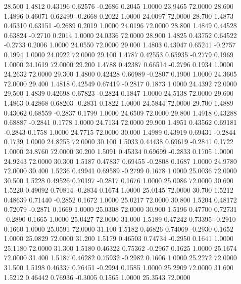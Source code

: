   28.500   1.4812   0.43196   0.62576  -0.2686   0.2045   1.0000  23.9465  72.0000
  28.600   1.4896   0.46071   0.62499  -0.2668   0.2022   1.0000  24.0097  72.0000
  28.700   1.4873   0.45310   0.63151  -0.2689   0.2019   1.0000  24.0196  72.0000
  28.800   1.4849   0.44528   0.63824  -0.2710   0.2014   1.0000  24.0336  72.0000
  28.900   1.4825   0.43752   0.64522  -0.2733   0.2006   1.0000  24.0550  72.0000
  29.000   1.4803   0.43047   0.65241  -0.2757   0.1994   1.0000  24.0922  72.0000
  29.100   1.4787   0.42553   0.65935  -0.2779   0.1969   1.0000  24.1619  72.0000
  29.200   1.4788   0.42387   0.66514  -0.2796   0.1934   1.0000  24.2632  72.0000
  29.300   1.4800   0.42428   0.66989  -0.2807   0.1900   1.0000  24.3605  72.0000
  29.400   1.4818   0.42549   0.67419  -0.2817   0.1873   1.0000  24.4392  72.0000
  29.500   1.4839   0.42698   0.67823  -0.2824   0.1847   1.0000  24.5138  72.0000
  29.600   1.4863   0.42868   0.68203  -0.2831   0.1822   1.0000  24.5844  72.0000
  29.700   1.4889   0.43062   0.68559  -0.2837   0.1799   1.0000  24.6509  72.0000
  29.800   1.4918   0.43288   0.68887  -0.2841   0.1778   1.0000  24.7134  72.0000
  29.900   1.4951   0.43562   0.69181  -0.2843   0.1758   1.0000  24.7715  72.0000
  30.000   1.4989   0.43919   0.69431  -0.2844   0.1739   1.0000  24.8255  72.0000
  30.100   1.5033   0.44438   0.69619  -0.2841   0.1722   1.0000  24.8760  72.0000
  30.200   1.5091   0.45334   0.69699  -0.2833   0.1705   1.0000  24.9243  72.0000
  30.300   1.5187   0.47837   0.69455  -0.2808   0.1687   1.0000  24.9780  72.0000
  30.400   1.5236   0.49941   0.69589  -0.2799   0.1678   1.0000  25.0036  72.0000
  30.500   1.5228   0.49526   0.70197  -0.2817   0.1676   1.0000  25.0086  72.0000
  30.600   1.5220   0.49092   0.70814  -0.2834   0.1674   1.0000  25.0145  72.0000
  30.700   1.5212   0.48639   0.71440  -0.2852   0.1672   1.0000  25.0217  72.0000
  30.800   1.5204   0.48172   0.72079  -0.2871   0.1669   1.0000  25.0308  72.0000
  30.900   1.5196   0.47700   0.72731  -0.2890   0.1665   1.0000  25.0427  72.0000
  31.000   1.5189   0.47242   0.73395  -0.2910   0.1660   1.0000  25.0591  72.0000
  31.100   1.5182   0.46826   0.74069  -0.2930   0.1652   1.0000  25.0829  72.0000
  31.200   1.5179   0.46503   0.74734  -0.2950   0.1641   1.0000  25.1180  72.0000
  31.300   1.5180   0.46322   0.75362  -0.2967   0.1625   1.0000  25.1674  72.0000
  31.400   1.5187   0.46282   0.75932  -0.2982   0.1606   1.0000  25.2272  72.0000
  31.500   1.5198   0.46337   0.76451  -0.2994   0.1585   1.0000  25.2909  72.0000
  31.600   1.5212   0.46442   0.76936  -0.3005   0.1565   1.0000  25.3543  72.0000

